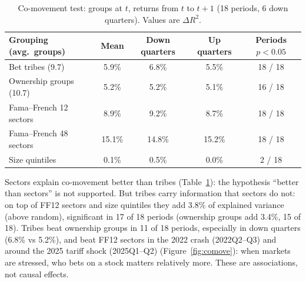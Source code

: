 \documentclass[10pt,a4paper]{article}
\begin{document}
\begin{table}[H]
\centering\footnotesize\setlength{\tabcolsep}{4pt}
\caption{Co-movement test: groups at $t$, returns from $t$ to $t+1$ (18 periods, 6 down quarters). Values are $\Delta R^2$.}
\label{tab:comove}
\begin{tabular}{@{}lcccc@{}}
\toprule
Grouping (avg.\ groups) & Mean & Down quarters & Up quarters & Periods $p<0.05$ \\
\midrule
Bet tribes (9.7) & 5.9\% & 6.8\% & 5.5\% & 18 / 18 \\
Ownership groups (10.7) & 5.2\% & 5.2\% & 5.1\% & 16 / 18 \\
Fama--French 12 sectors & 8.9\% & 9.2\% & 8.7\% & 18 / 18 \\
Fama--French 48 sectors & 15.1\% & 14.8\% & 15.2\% & 18 / 18 \\
Size quintiles & 0.1\% & 0.5\% & 0.0\% & 2 / 18 \\
\bottomrule
\end{tabular}
\end{table}
Sectors explain co-movement better than tribes (Table~\ref{tab:comove}): the hypothesis ``better than sectors'' is not supported. But tribes carry information that sectors do not: on top of FF12 sectors and size quintiles they add 3.8\% of explained variance (above random), significant in 17 of 18 periods (ownership groups add 3.4\%, 15 of 18). Tribes beat ownership groups in 11 of 18 periods, especially in down quarters (6.8\% vs 5.2\%), and beat FF12 sectors in the 2022 crash (2022Q2--Q3) and around the 2025 tariff shock (2025Q1--Q2) (Figure~\ref{fig:comove}): when markets are stressed, who bets on a stock matters relatively more. These are associations, not causal effects.

\end{document}
